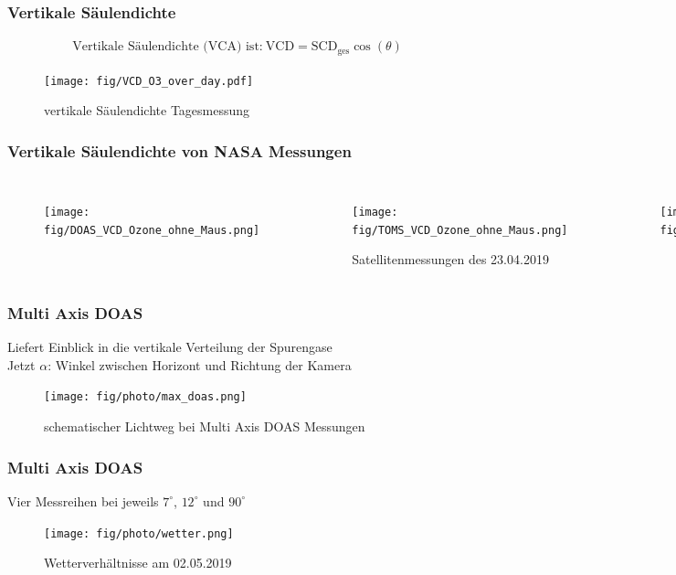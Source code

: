 \documentclass{beamer}
\begin{document}
\begin{frame}
    \frametitle{Vertikale Säulendichte }
    \begin{align}
    	\text{Vertikale Säulendichte (VCA) ist:}\	\text{VCD} = \text{SCD}_\text{ges} \cos (\theta)
    \end{align}
    
    \vspace{-0.5cm}
    
    \begin{figure}
    	\texttt{[image: fig/VCD\_O3\_over\_day.pdf]}
		\caption{vertikale Säulendichte Tagesmessung }    
	\end{figure}
\end{frame}

\begin{frame}
	\frametitle{Vertikale Säulendichte  von NASA Messungen}
	\vspace{-0.35cm}
	\begin{columns}
		\begin{figure}	
    		\texttt{[image: fig/DOAS\_VCD\_Ozone\_ohne\_Maus.png]}
    	\end{figure}
    	\vspace{-1cm}
    	\begin{figure}
    		\texttt{[image: fig/TOMS\_VCD\_Ozone\_ohne\_Maus.png]}
    		\caption{ Satellitenmessungen des 23.04.2019 \cite{giovanni_nasa}}
    	\end{figure}		
      	\begin{figure}	
      		\texttt{[image: fig/DOAS\_VCD\_Ozone\_legende.png]}
      	\end{figure}
	\end{columns}
\end{frame}

\begin{frame}
    \frametitle{Multi Axis DOAS}
    Liefert Einblick in die vertikale Verteilung der Spurengase \\
    Jetzt $\alpha$: Winkel zwischen Horizont und Richtung der Kamera
    \begin{figure}
        \texttt{[image: fig/photo/max\_doas.png]}
        \caption{schematischer Lichtweg bei Multi Axis DOAS Messungen \cite{atm_script}}
    \end{figure}
\end{frame}

\begin{frame}
    \frametitle{Multi Axis DOAS}
    Vier Messreihen bei jeweils $7^\circ$, $12^\circ$ und $90^\circ$ \\
    \begin{figure}
    	\texttt{[image: fig/photo/wetter.png]}
    	\caption{Wetterverhältnisse am 02.05.2019}
    \end{figure}
\end{frame}
\end{document}
